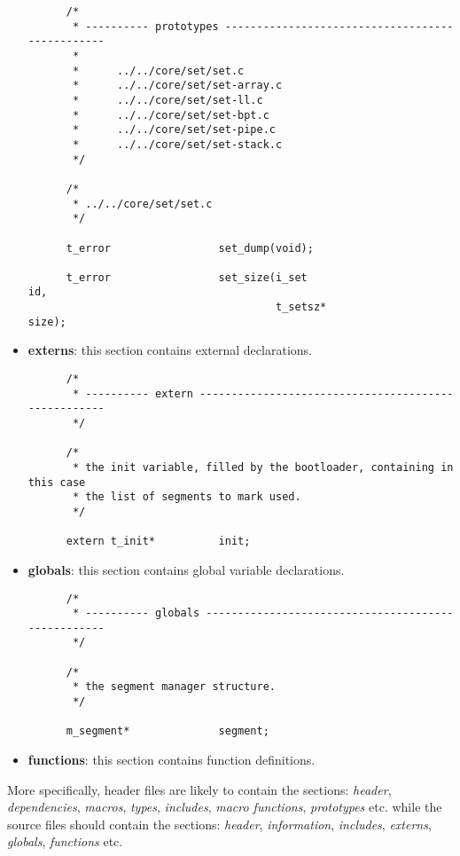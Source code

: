 \begin{itemize}
    \begin{verbatim}
      /*
       * ---------- prototypes ------------------------------------------------
       *
       *      ../../core/set/set.c
       *      ../../core/set/set-array.c
       *      ../../core/set/set-ll.c
       *      ../../core/set/set-bpt.c
       *      ../../core/set/set-pipe.c
       *      ../../core/set/set-stack.c
       */

      /*
       * ../../core/set/set.c
       */

      t_error                 set_dump(void);

      t_error                 set_size(i_set                          id,
                                       t_setsz*                       size);
    \end{verbatim}
  \item
    \textbf{externs}: this section contains external declarations.

    \begin{verbatim}
      /*
       * ---------- extern ----------------------------------------------------
       */

      /*
       * the init variable, filled by the bootloader, containing in this case
       * the list of segments to mark used.
       */

      extern t_init*          init;
    \end{verbatim}
  \item
    \textbf{globals}: this section contains global variable declarations.

    \begin{verbatim}
      /*
       * ---------- globals ---------------------------------------------------
       */

      /*
       * the segment manager structure.
       */

      m_segment*              segment;
    \end{verbatim}
  \item
    \textbf{functions}: this section contains function definitions.
\end{itemize}

More specifically, header files are likely to contain the sections:
\textit{header}, \textit{dependencies}, \textit{macros}, \textit{types},
\textit{includes}, \textit{macro functions}, \textit{prototypes} etc. while
the source files should contain the sections: \textit{header},
\textit{information}, \textit{includes}, \textit{externs}, \textit{globals},
\textit{functions} etc.

